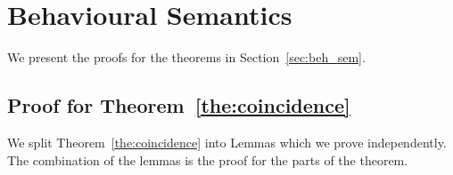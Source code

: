 \section{Behavioural Semantics}

We present the proofs for the theorems in
Section~\ref{sec:beh_sem}.

\subsection{Proof for Theorem~\ref{the:coincidence}}

We split Theorem~\ref{the:coincidence} into 
Lemmas which we prove independently.
The combination of the lemmas is the proof for the parts
of the theorem.

\begin{comment}


We develop an auxiliary lemma used to prove
the requirements of Theorem~\ref{the:coincidence}.

\begin{lemma}\rm
	\label{lem:aux}
	$\Gamma; \emptyset; \Delta_1 \by{\bactout{s}{(x) P}} \Delta_2 \proves P_1 \by{\bactout{s}{(x) P}} P_2$
	implies that $\exists s'$ such that $\Gamma; \emptyset; \Delta_1 \cat s': S \proves P_2 \Par P \subst{s'}{x}$
\end{lemma}

\begin{proof}

	\noi We do an induction on the labelled transition system
	derivation for action $\bactout{s}{(x) P}$.
	{\bf Basic Step: }

	\[
		\bout{s}{(x) P} P_2 \by{\bactout{s}{(x) P}} P_2
	\]
	\noi and
	\[
		\Gamma; \emptyset; \Delta_1 \proves \bout{s}{(x) P} P_2 \hastype \Proc
	\]
	\noi Type rule $\trule{Send}$ implies
	\begin{eqnarray}
		\Gamma; \emptyset; \Delta_1' &\proves& P_2 \hastype \Proc \label{lem:aux1}\\
		\Gamma; \emptyset; \Delta_1'' &\proves& (x) P \hastype U \label{lem:aux2} \\
		\Delta_1 &=& (\Delta_1' \cup \Delta_1'')\backslash s \cup \set{s: \btout{U} S}
	\end{eqnarray}
	\noi Rule $\trule{Abs}$ implies that from~\ref{lem:aux2} we get
	\begin{eqnarray*}
		\Gamma; \emptyset; \Delta_1'' \cat x: S' \proves P \hastype \Proc
	\end{eqnarray*}
	\noi we apply the Substitution Lemma~\ref{aaa} to get that for fresh $s'$
	\begin{eqnarray*}
		\Gamma; \emptyset; \Delta_1'' \cat s': S' \proves P\subst{s'}{x} \hastype \Proc
	\end{eqnarray*}
	\noi Finally we apply rule $\trule{Par}$ to~\ref{lem:aux1} and the latter judgement to get
	\begin{eqnarray*}
		\Gamma; \emptyset; \Delta_1' \cup \Delta_1'' \cat s': S' \proves P_2 \Par P\subst{s'}{x} \hastype \Proc
	\end{eqnarray*}


\end{comment}
